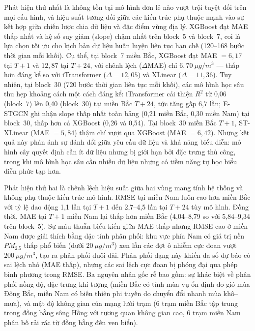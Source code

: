 Phát hiện thứ nhất là không tồn tại mô hình đơn lẻ nào vượt trội tuyệt đối trên mọi cấu hình, và hiệu suất tương đối giữa các kiến trúc phụ thuộc mạnh vào sự kết hợp giữa chiến lược chia dữ liệu và đặc điểm vùng địa lý. XGBoost đạt MAE thấp nhất và hệ số suy giảm (slope) chậm nhất trên block~5 và block~7, coi là lựa chọn tối ưu cho kịch bản dữ liệu huấn luyện liên tục hạn chế (120--168 bước thời gian mỗi khối). Cụ thể, tại block~7 miền Bắc, XGBoost đạt MAE $= 6{,}17$ tại $T{+}1$ và $12{,}87$ tại $T{+}24$, với chênh lệch ($\Delta$MAE) chỉ $6{,}70~\mu g/m^3$ --- thấp hơn đáng kể so với iTransformer ($\Delta = 12{,}05$) và XLinear ($\Delta = 11{,}36$). Tuy nhiên, tại block~30 (720 bước thời gian liên tục mỗi khối), các mô hình học sâu thu hẹp khoảng cách một cách đáng kể: iTransformer cải thiện $R^2$ từ 0,06 (block~7) lên 0,40 (block~30) tại miền Bắc $T{+}24$, tức tăng gấp 6,7 lần; E-STGCN ghi nhận slope thấp nhất toàn bảng (0,21 miền Bắc, 0,30 miền Nam) tại block~30, thấp hơn cả XGBoost (0,26 và 0,54). Tại block~30 miền Bắc $T{+}1$, ST-XLinear (MAE $= 5{,}84$) thậm chí vượt qua XGBoost (MAE $= 6{,}42$). Những kết quả này phản ánh sự đánh đổi giữa yêu cầu dữ liệu và khả năng biểu diễn: mô hình cây quyết định cần ít dữ liệu nhưng bị giới hạn bởi đặc trưng thủ công, trong khi mô hình học sâu cần nhiều dữ liệu nhưng có tiềm năng tự học biểu diễn phức tạp hơn.

Phát hiện thứ hai là chênh lệch hiệu suất giữa hai vùng mang tính hệ thống và không phụ thuộc kiến trúc mô hình. RMSE tại miền Nam luôn cao hơn miền Bắc với tỷ lệ dao động 1,1 lần tại $T{+}1$ đến 2,7--4,5 lần tại $T{+}24$ tùy mô hình. Đồng thời, MAE tại $T{+}1$ miền Nam lại thấp hơn miền Bắc (4,04--8,79 so với 5,84--9,34 trên block~5). Sự mâu thuẫn biểu kiến giữa MAE thấp nhưng RMSE cao ở miền Nam được giải thích bằng đặc tính phân phối: khu vực phía Nam có giá trị nền $PM_{2.5}$ thấp phổ biến (dưới $20~\mu g/m^3$) xen lẫn các đợt ô nhiễm cực đoan vượt $200~\mu g/m^3$, tạo ra phân phối đuôi dài. Phân phối dạng này khiến đa số dự báo có sai lệch nhỏ (MAE thấp), nhưng các sai lệch cực đoan bị phóng đại qua phép bình phương trong RMSE. Ba nguyên nhân gốc rễ bao gồm: sự khác biệt về phân phối nồng độ, đặc trưng khí tượng (miền Bắc có tính mùa vụ ổn định do gió mùa Đông Bắc, miền Nam có biến thiên phi tuyến do chuyển đổi nhanh mùa khô--mưa), và mật độ không gian của mạng lưới trạm (6 trạm miền Bắc tập trung trong đồng bằng sông Hồng với tương quan không gian cao, 6 trạm miền Nam phân bố rải rác từ đồng bằng đến ven biển).

